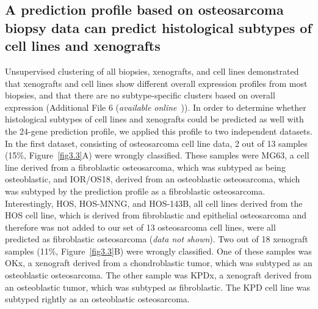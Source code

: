 \subsection{A prediction profile based on osteosarcoma biopsy data can predict histological subtypes of cell lines and xenografts}
Unsupervised clustering of all biopsies, xenografts, and
cell lines demonstrated that xenografts and cell lines
show different overall expression profiles from most
biopsies, and that there are no subtype\hyp{}specific clusters
based on overall expression (Additional File 6 ({\it available online}~\cite{ch3additional})). In order
to determine whether histological subtypes of cell lines
and xenografts could be predicted as well with the 24-gene prediction profile, we applied this profile to two
independent datasets. In the first dataset, consisting of
osteosarcoma cell line data, 2 out of 13 samples (15\%,
Figure~\ref{fig3.3}A) were wrongly classified.
%
These samples were
MG63, a cell line derived from a fibroblastic osteosarcoma,
which was subtyped as being osteoblastic, and
IOR/OS18, derived from an osteoblastic osteosarcoma,
which was subtyped by the prediction profile as a fibroblastic
osteosarcoma. Interestingly, HOS, HOS-MNNG,
and HOS-143B, all cell lines derived from the HOS cell
line, which is derived from fibroblastic and epithelial
osteosarcoma and therefore was not added to our set of
13 osteosarcoma cell lines, were all predicted as fibroblastic
osteosarcoma ({\it data not shown}). Two out of 18
xenograft samples (11\%, Figure~\ref{fig3.3}B) were wrongly
classified. One of these samples was OKx, a xenograft
derived from a chondroblastic tumor, which was subtyped
as an osteoblastic osteosarcoma. The other sample
was KPDx, a xenograft derived from an osteoblastic
tumor, which was subtyped as fibroblastic. The KPD cell
line was subtyped rightly as an osteoblastic
osteosarcoma.
%

